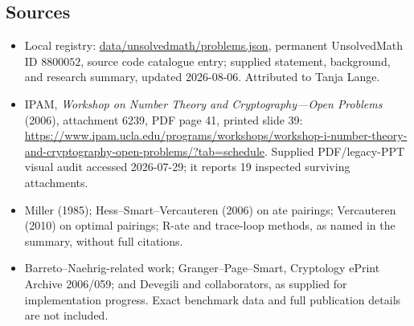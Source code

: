 \documentclass[11pt]{article}
\begin{document}
\subsection{Sources}
\begin{itemize}
\item Local registry: \url{data/unsolvedmath/problems.json}, permanent UnsolvedMath ID \(8800052\), source code catalogue entry; supplied statement, background, and research summary, updated 2026-08-06. Attributed to Tanja Lange.
\item IPAM, \emph{Workshop on Number Theory and Cryptography---Open Problems} (2006), attachment 6239, PDF page 41, printed slide 39: \url{https://www.ipam.ucla.edu/programs/workshops/workshop-i-number-theory-and-cryptography-open-problems/?tab=schedule}. Supplied PDF/legacy-PPT visual audit accessed 2026-07-29; it reports 19 inspected surviving attachments.
\item Miller (1985); Hess--Smart--Vercauteren (2006) on ate pairings; Vercauteren (2010) on optimal pairings; R-ate and trace-loop methods, as named in the summary, without full citations.
\item Barreto--Naehrig-related work; Granger--Page--Smart, Cryptology ePrint Archive 2006/059; and Devegili and collaborators, as supplied for implementation progress. Exact benchmark data and full publication details are not included.
\end{itemize}
\end{document}
